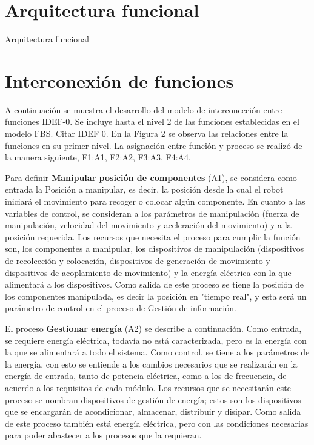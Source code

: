 \section{Arquitectura funcional}
\label{Arquitectura_funcional}

Arquitectura funcional
\par
\section{Interconexi\'on de funciones}
%
A continuaci\'on se muestra el desarrollo del modelo de interconecci\'on entre funciones IDEF-0. Se incluye hasta el nivel 2 de las funciones establecidas en el modelo FBS. Citar IDEF 0. En la Figura 2 se observa las relaciones entre la funciones en su primer nivel. La asignaci\'on entre funci\'on y proceso se realiz\'o de la manera siguiente, F1:A1, F2:A2, F3:A3, F4:A4.

Para definir \textbf{Manipular posici\'on de componentes} (A1), se considera como entrada la Posici\'on a manipular, es decir, la posici\'on desde la cual el robot iniciar\'a el movimiento para recoger o colocar alg\'un componente. En cuanto a las variables de control, se consideran a los par\'ametros de manipulaci\'on (fuerza de manipulaci\'on, velocidad del movimiento y aceleraci\'on del movimiento) y a la posici\'on requerida. Los recursos que necesita el proceso para cumplir la funci\'on son, los componentes a manipular, los dispositivos de manipulaci\'on (dispositivos de recolecci\'on y colocaci\'on, dispositivos de generaci\'on de movimiento y dispositivos de acoplamiento de movimiento) y la energ\'ia el\'ectrica con la que alimentar\'a a los dispositivos. Como salida de este proceso se tiene la posici\'on de los componentes manipulada, es decir la posici\'on en "tiempo real", y esta ser\'a un par\'ametro de control en el proceso de Gesti\'on de informaci\'on.

El proceso \textbf{Gestionar energ\'ia} (A2) se describe a continuaci\'on. Como entrada, se requiere energ\'ia el\'ectrica, todav\'ia no est\'a caracterizada, pero es la energ\'ia con la que se alimentar\'a a todo el sistema. Como control, se tiene a los par\'ametros de la energ\'ia, con esto se entiende a los cambios necesarios que se realizar\'an en la energ\'ia de entrada, tanto de potencia el\'ectrica, como a los de frecuencia, de acuerdo a los requisitos de cada m\'odulo. Los recursos que se necesitar\'an este proceso se nombran dispositivos de gesti\'on de energ\'ia; estos son los dispositivos que se encargar\'an de acondicionar, almacenar, distribuir y disipar. Como salida de este proceso tambi\'en est\'a energ\'ia el\'ectrica, pero con las condiciones necesarias para poder abastecer a los procesos que la requieran.

